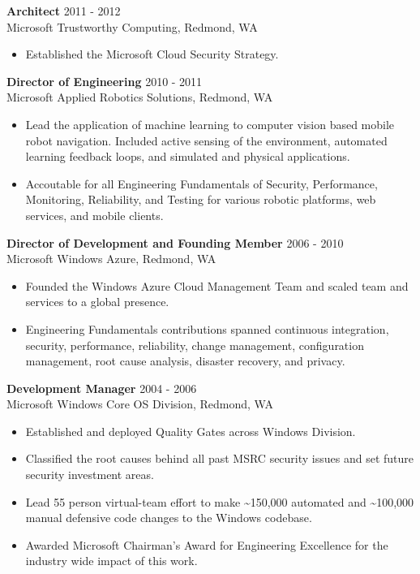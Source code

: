 \begin{resume}
 {\bf Architect} \hfill 2011 - 2012\\
 Microsoft Trustworthy Computing, Redmond, WA
 \begin{itemize} \itemsep -2pt
 \item Established the Microsoft Cloud Security Strategy.
 \end{itemize}
 
{\bf Director of Engineering} \hfill 2010 - 2011\\
 Microsoft Applied Robotics Solutions, Redmond, WA
 \begin{itemize} \itemsep -2pt
 \item Lead the application of machine learning to computer vision based mobile robot navigation. Included active sensing of the environment, automated learning feedback loops, and simulated and physical applications.
 \item Accoutable for all Engineering Fundamentals of Security, Performance, Monitoring, Reliability, and Testing for various robotic platforms, web services, and mobile clients.
 \end{itemize}
  
{\bf Director of Development and Founding Member} \hfill 2006 - 2010\\
 Microsoft Windows Azure, Redmond, WA
 \begin{itemize} \itemsep -2pt
 \item Founded the Windows Azure Cloud Management Team and scaled team and services to a global presence.
 \item Engineering Fundamentals contributions spanned continuous integration, security, performance, reliability, change management, configuration management, root cause analysis, disaster recovery, and privacy.
 \end{itemize}

{\bf Development Manager} \hfill 2004 - 2006\\
 Microsoft Windows Core OS Division, Redmond, WA
 \begin{itemize} \itemsep -2pt  %
 \item Established and deployed Quality Gates across Windows Division.
 \item Classified the root causes behind all past MSRC security issues and set future security investment areas.
 \item Lead 55 person virtual-team effort to make \textasciitilde{}150,000 automated and \textasciitilde{}100,000 manual defensive code changes to the Windows codebase.
 \item Awarded Microsoft Chairman's Award for Engineering Excellence for the industry wide impact of this work.
 

\end{itemize}
\end{resume}
